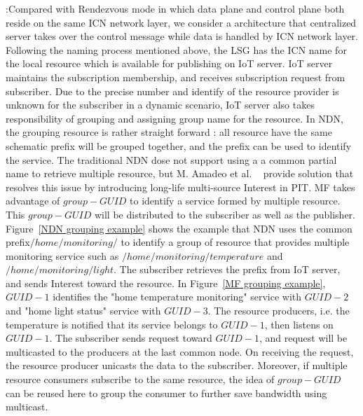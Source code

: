 \vspace{1mm}:Compared with Rendezvous mode in which data plane and control plane both reside on the same ICN network layer, we consider a architecture that centralized server takes over the control message while data is handled by ICN network layer. Following the naming process mentioned above, the LSG has the ICN name for the local resource which is available for publishing on IoT server. IoT server maintains the subscription membership, and receives subscription request from subscriber. Due to the precise number and identify of the resource provider is unknown for the subscriber in a dynamic scenario, IoT server also takes responsibility of grouping and assigning group name for the resource.
In NDN, the grouping resource is rather straight forward : all resource have the same schematic prefix will be grouped together, and the prefix can be used to identify the service. The traditional NDN dose not support using a a common partial name to retrieve multiple resource, but M. Amadeo et al. ~\cite{**Multi-source paper**} provide solution that resolves this issue by introducing long-life multi-source Interest in PIT.
MF takes advantage of  $group-GUID$ to identify a service formed by multiple resource. This $group-GUID$ will be distributed to the subscriber as well as the publisher. Figure~\ref{NDN grouping example} shows the example that NDN uses the common prefix$/home/monitoring/$ to identify a group of resource that provides multiple monitoring service such as $/home/monitoring/temperature$ and $/home/monitoring/light$. The subscriber retrieves the prefix from IoT server, and sends Interest toward the resource. In Figure~\ref{MF grouping example}, $GUID-1$ identifies the "home temperature monitoring" service with $GUID-2$ and "home light status" service with $GUID-3$. The resource producers, i.e. the temperature is notified that its service belongs to $GUID-1$, then listens on $GUID-1$. The subscriber sends request toward  $GUID-1$, and request will be multicasted to the producers at the last common node. On receiving the request, the resource producer unicasts the data to the subscriber. Moreover, if multiple resource consumers subscribe to the same resource,
the idea of $group-GUID$ can be reused here to group the consumer to further save bandwidth using multicast.
